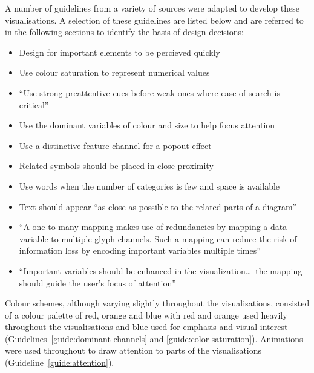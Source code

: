 A number of guidelines from a variety of sources were adapted to develop these visualisations. A selection of these guidelines are listed below and are referred to in the following sections to identify the basis of design decisions:
\begin{itemize}
\item Design for important elements to be percieved quickly \cite[p.~14]{Ware2013a} 
\item Use colour saturation to represent numerical values \cite[p.~117]{Ware2013a} 
\item ``Use strong preattentive cues before weak ones where ease of search is critical'' \cite[p.~156]{Ware2013a} 
\item Use the dominant variables of colour and size to help focus attention \cite[p.~45]{Borgo2013} 
\item Use a distinctive feature channel for a popout effect \cite[p.~157]{Ware2013a} 
\item Related symbols should be placed in close proximity \cite[p.~181]{Ware2013a} 
\item Use words when the number of categories is few and space is available \cite[p.~321]{Ware2013a} 
\item Text should appear ``as close as possible to the related parts of a diagram'' \cite[p.~333]{Ware2013a} 
\item ``A one-to-many mapping makes use of redundancies by mapping a data variable to multiple glyph channels. Such a mapping can reduce the risk of information loss by encoding important variables multiple times'' \cite[p.~52]{Borgo2013} 
\item ``Important variables should be enhanced in the visualization\ldots~the mapping should guide the user's focus of attention'' \cite[p.~52]{Borgo2013} 
\end{itemize}

Colour schemes, although varying slightly throughout the visualisations, consisted of a colour palette of red, orange and blue with red and orange used heavily throughout the visualisations and blue used for emphasis and visual interest (Guidelines~\ref{guide:dominant-channels} and \ref{guide:color-saturation}). Animations were used throughout to draw attention to parts of the visualisations (Guideline~\ref{guide:attention}).


